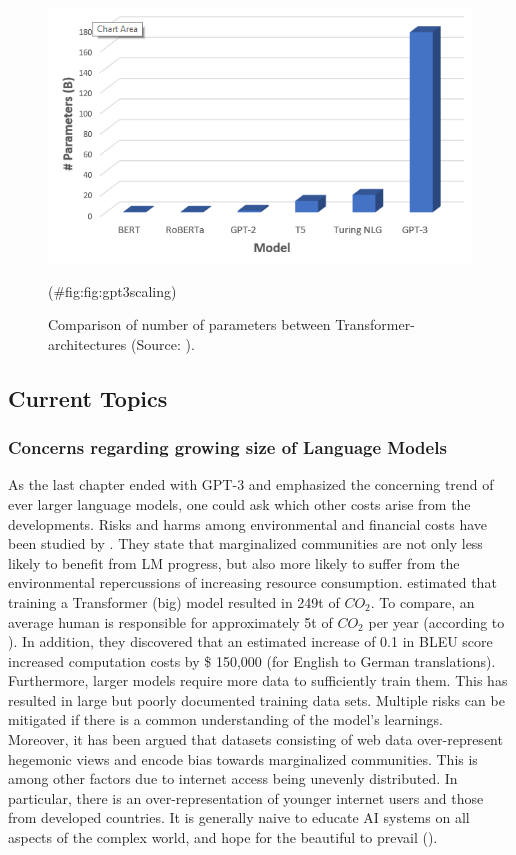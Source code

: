 \documentclass[
]{krantz}
\begin{document}
\begin{figure}

{\centering \includegraphics[width=0.7\linewidth]{./figures/01-01-nlp/gpt3_comparison} 

}

\caption{Comparison of number of parameters between Transformer-architectures (Source: \citet{Saifee2020}).}(\#fig:fig:gpt3scaling)
\end{figure}



\hypertarget{current-topics}{%
\subsection{Current Topics}\label{current-topics}}

\hypertarget{sec:concerns-lm}{%
\subsubsection{Concerns regarding growing size of Language Models}\label{sec:concerns-lm}}

As the last chapter ended with GPT-3 and emphasized the concerning trend
of ever larger language models, one could ask which other costs arise
from the developments. Risks and harms among environmental and financial
costs have been studied by \citep{Bender2021}. They state that marginalized
communities are not only less likely to benefit from LM progress, but
also more likely to suffer from the environmental repercussions of
increasing resource consumption. \citep{strubel2019energy} estimated that training
a Transformer (big) model resulted in 249t of \(CO_2\). To compare, an
average human is responsible for approximately 5t of \(CO_2\) per year
(according to \citep{Ritchie2020}). In addition, they discovered that an
estimated increase of 0.1 in BLEU score increased computation costs by
\$ 150,000 (for English to German translations). Furthermore, larger
models require more data to sufficiently train them. This has resulted
in large but poorly documented training data sets. Multiple risks can be
mitigated if there is a common understanding of the model's learnings.\\
Moreover, it has been argued that datasets consisting of web data
over-represent hegemonic views and encode bias towards marginalized
communities. This is among other factors due to internet access being
unevenly distributed. In particular, there is an over-representation of
younger internet users and those from developed countries. It is
generally naive to educate AI systems on all aspects of the complex
world, and hope for the beautiful to prevail (\citep{Bender2021}).
\end{document}
